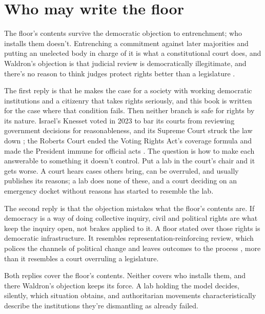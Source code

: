 \section{Who may write the floor}
\label{sec:14.1}
The floor's contents survive the democratic objection to entrenchment; who installs them doesn't. Entrenching a commitment against later majorities and putting an unelected body in charge of it is what a constitutional court does, and Waldron's objection is that judicial review is democratically illegitimate, and there's no reason to think judges protect rights better than a legislature \autocite{waldron2006core}.

The first reply is that he makes the case for a society with working democratic institutions and a citizenry that takes rights seriously, and this book is written for the case where that condition fails. Then neither branch is safe for rights by its nature. Israel's Knesset voted in 2023 to bar its courts from reviewing government decisions for reasonableness, and its Supreme Court struck the law down \autocite{sharon2024reasonableness}; the Roberts Court ended the Voting Rights Act's coverage formula \autocite{shelby2013} and made the President immune for official acts \autocite{trump2024immunity}. The question is how to make each answerable to something it doesn't control. Put a lab in the court's chair and it gets worse. A court hears cases others bring, can be overruled, and usually publishes its reasons; a lab does none of these, and a court deciding on an emergency docket without reasons has started to resemble the lab.

The second reply is that the objection mistakes what the floor's contents are. If democracy is a way of doing collective inquiry, civil and political rights are what keep the inquiry open, not brakes applied to it. A floor stated over those rights is democratic infrastructure. It resembles representation-reinforcing review, which polices the channels of political change and leaves outcomes to the process \autocite{ely1980democracy}, more than it resembles a court overruling a legislature.

Both replies cover the floor's contents. Neither covers who installs them, and there Waldron's objection keeps its force. A lab holding the model decides, silently, which situation obtains, and authoritarian movements characteristically describe the institutions they're dismantling as already failed.

